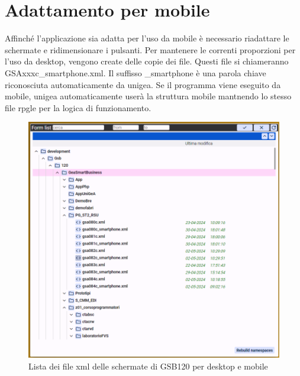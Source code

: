 \documentclass[target=bach,aauheader=,style=]{thud}
\begin{document}
\section{Adattamento per mobile}
Affinché l'applicazione sia adatta per l'uso da mobile è necessario riadattare le schermate e ridimensionare i pulsanti.
Per mantenere le correnti proporzioni per l'uso da desktop, vengono create delle copie dei file.
Questi file si chiameranno GSAxxxc\_smartphone.xml.
Il suffisso \_smartphone è una parola chiave riconosciuta automaticamente da unigea. Se il programma viene eseguito da mobile, unigea automaticamente userà la struttura mobile mantnendo lo stesso file rpgle per la logica di funzionamento.
\begin{figure}[h]
    \centering
    \includegraphics[width=0.6\linewidth]{screenshot/Lista_gsb120.png}
    \caption{Lista dei file xml delle schermate di GSB120 per desktop e mobile}
\end{figure}
\newpage
\end{document}
